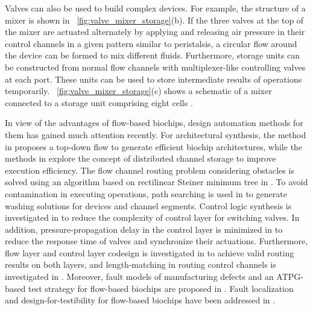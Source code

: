 Valves can also be used to build complex devices. For example, the
structure of a mixer is shown in \figname~\ref{fig:valve_mixer_storage}(b).  If
the three valves at the top of the mixer are actuated alternately by applying
and releasing air pressure in their control channels in a given pattern similar
to peristalsis, a
circular flow around the device can be formed to mix different fluids.
Furthermore, 
storage units can be constructed from normal flow channels with multiplexer-like
controlling valves at each port. These units can be used to store intermediate
results of operations temporarily.
\figname~\ref{fig:valve_mixer_storage}(c) shows a schematic of a mixer
connected to a storage unit comprising eight cells \cite{AminTA09}. 

In view of the advantages of flow-based biochips, design automation methods for
them has gained much attention recently. For architectural synthesis, 
the method in \cite{MinhassPMB12} proposes a top-down
flow to generate efficient biochip architectures, while 
the methods in \cite{TsengLSH15,Liu2017} explore the concept of
distributed channel storage to improve execution efficiency.
The flow channel routing problem considering obstacles 
is solved using an algorithm based on rectilinear Steiner minimum tree
in \cite{LinLCLH14}.
To avoid contamination in executing operations, 
path searching is used in \cite{HuHC16} to generate washing solutions for 
devices and channel segments. 
Control logic synthesis is investigated in \cite{MinhassPMH13,WZYH17,Zhu2018iccad}
to reduce the complexity of control layer for switching valves.
In addition, pressure-propagation delay in the control layer is 
minimized in  \cite{HuDHC17} to reduce the response
time of valves and synchronize their actuations.
Furthermore, flow layer and control layer codesign is investigated in
\cite{YaoWRCH15} to achieve valid routing results on both layers, and
length-matching in routing control channels is investigated in \cite{YaoHC15}.
Moreover, fault models of manufacturing defects 
and an ATPG-based test strategy for flow-based biochips are proposed
in \cite{HuYHC14,HuHC14}. 
Fault localization and design-for-testibility
for flow-based biochips have been addressed in \cite{Liu2018dac,aledate19}.

